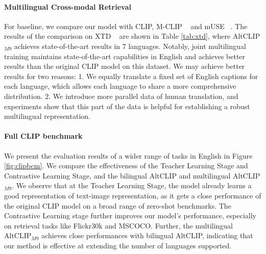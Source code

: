 \paragraph{Multilingual Cross-modal Retrieval}
For baseline, we compare our model with CLIP, M-CLIP ~\cite{carlsson2022cross} and mUSE ~\cite{yang-etal-2020-multilingual}. The results of the comparison on XTD ~\cite{aggarwal2020zeroshot} are shown in Table \ref{tab:xtd}, where AltCLIP$_{M9}$ achieves state-of-the-art results in 7 languages. Notably, joint multilingual training maintains state-of-the-art capabilities in English and achieves better results than the original CLIP model on this dataset. We may achieve better results for two reasons: 1. We equally translate a fixed set of English captions for each language, which allows each language to share a more comprehensive distribution. 2. We introduce more parallel data of human translation, and experiments show that this part of the data is helpful for establishing a robust multilingual representation.

\paragraph{Full CLIP benchmark}
We present the evaluation results of a wider range of tasks in English in Figure \ref{fig:clipbcm}. We compare the effectiveness of the Teacher Learning Stage and Contrastive Learning Stage, and the bilingual AltCLIP and multilingual AltCLIP$_{M9}$. We observe that at the Teacher Learning Stage, the model already learns a good representation of text-image representation, as it gets a close performance of the original CLIP model on a broad range of zero-shot benchmarks. The Contrastive Learning stage further improves our model’s performance, especially on retrieval tasks like Flickr30k and MSCOCO. Further, the multilingual AltCLIP$_{M9}$ achieves close performances with bilingual AltCLIP, indicating that our method is effective at extending the number of languages supported.

